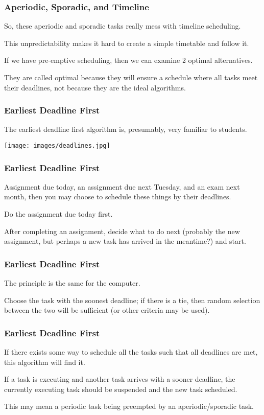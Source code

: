 \begin{frame}
\frametitle{Aperiodic, Sporadic, and Timeline}

So, these aperiodic and sporadic tasks really mess with timeline scheduling. 

This unpredictability makes it hard to create a simple timetable and follow it.

If we have pre-emptive scheduling, then we can examine 2 optimal alternatives. 

They are called optimal because they will ensure a schedule where all tasks meet their deadlines, not because they are the ideal algorithms.



\end{frame}

\begin{frame}
\frametitle{Earliest Deadline First}

The earliest deadline first algorithm is, presumably, very familiar to students. 

\begin{center}
	\texttt{[image: images/deadlines.jpg]}
\end{center}

\end{frame}

\begin{frame}
\frametitle{Earliest Deadline First}

Assignment due today, an assignment due next Tuesday, and an exam next month, then you may choose to schedule these things by their deadlines. 

Do the assignment due today first. 

After completing an assignment, decide what to do next (probably the new assignment, but perhaps a new task has arrived in the meantime?) and start.


\end{frame}

\begin{frame}
\frametitle{Earliest Deadline First}

The principle is the same for the computer. 

Choose the task with the soonest deadline; if there is a tie, then random selection between the two will be sufficient (or other criteria may be used). 

\end{frame}

\begin{frame}
\frametitle{Earliest Deadline First}

If there exists some way to schedule all the tasks such that all deadlines are met, this algorithm will find it. 

If a task is executing and another task arrives with a sooner deadline, the currently executing task should be suspended and the new task scheduled. 

This may mean a periodic task being preempted by an aperiodic/sporadic task.


\end{frame}

